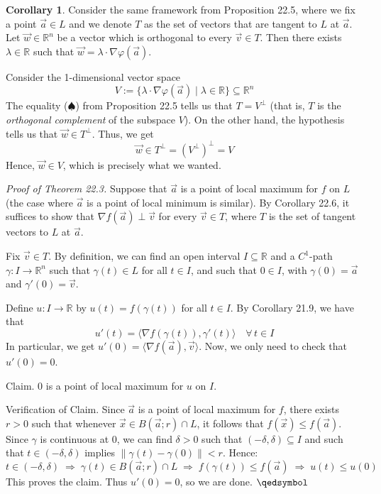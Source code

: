 \documentclass[11pt]{article}
\makeatletter
\theoremstyle{definition}
\newtheorem{cor}[thm]{Corollary}
\newcommand{\R}{\ensuremath{\mathbb{R}}}
\newenvironment{pf}[1][\proofname]{\par
  \pushQED{\qed}%
  \normalfont \topsep0\p@\relax
  \trivlist
  \item[\hskip\labelsep\itshape
  #1\@addpunct{.}]\ignorespaces
}{%
  \popQED\endtrivlist\@endpefalse
}
\makeatother
\begin{document}
\begin{cor}
Consider the same framework from Proposition 22.5, where we fix a point $\vec{a} \in L$ and we denote $T$ as the set of vectors that are tangent to $L$ at $\vec{a}$. Let $\vec{w} \in \R^n$ be a vector which is orthogonal to every $\vec{v} \in T$. Then there exists $\lambda \in \R$ such that $\vec{w} = \lambda \cdot \nabla \varphi(\vec{a})$.
\begin{pf}
Consider the 1-dimensional vector space 
$$V := \{ \lambda \cdot \nabla \varphi(\vec{a}) \mid \lambda \in \R\} \subseteq \R^n$$
The equality ($\spadesuit$) from Proposition 22.5 tells us that $T = V^\perp$ (that is, $T$ is the \emph{orthogonal complement} of the subspace $V$). On the other hand, the hypothesis tells us that $\vec{w} \in T^\perp$. Thus, we get
$$\vec{w} \in T^\perp = (V^\perp)^\perp = V$$
Hence, $\vec{w} \in V$, which is precisely what we wanted.
\end{pf}
\end{cor}

\emph{Proof of Theorem 22.3.} 
Suppose that $\vec{a}$ is a point of local maximum for $f$ on $L$ (the case where $\vec{a}$ is a point of local minimum is similar). By Corollary 22.6, it suffices to show that $\nabla f(\vec{a}) \perp \vec{v}$ for every $\vec{v} \in T$, where $T$ is the set of tangent vectors to $L$ at $\vec{a}$.

Fix $\vec{v} \in T$. By definition, we can find an open interval $I \subseteq \R$ and a $C^1$-path $\gamma : I \to \R^n$ such that $\gamma(t) \in L$ for all $t \in I$, and such that $0 \in I$, with $\gamma(0) = \vec{a}$ and $\gamma'(0) = \vec{v}$. 

Define $u : I \to \R$ by $u(t) = f(\gamma(t))$ for all $t \in I$. By Corollary 21.9, we have that
$$u'(t) = \langle \nabla f(\gamma(t)), \gamma'(t) \rangle \quad \forall\,t \in I$$
In particular, we get $u'(0) = \langle \nabla f(\vec{a}), \vec{v} \rangle$. Now, we only need to check that $u'(0) = 0$. 

{\sc Claim.} 0 is a point of local maximum for $u$ on $I$.

{\sc Verification of Claim.} Since $\vec{a}$ is a point of local maximum for $f$, there exists $r > 0$ such that whenever $\vec{x} \in B(\vec{a}; r) \cap L$, it follows that $f(\vec{x}) \leq f(\vec{a})$. Since $\gamma$ is continuous at 0, we can find $\delta > 0$ such that $(-\delta, \delta) \subseteq I$ and such that $t \in (-\delta, \delta)$ implies $\|\gamma(t) - \gamma(0)\| < r$. Hence:
$$t \in (-\delta, \delta) \; \Rightarrow \; \gamma(t) \in B(\vec{a}; r) \cap L \; \Rightarrow \; f(\gamma(t)) \leq f(\vec{a}) \; \Rightarrow \; u(t) \leq u(0)$$
This proves the claim. Thus $u'(0) = 0$, so we are done. \hfill $\qedsymbol$
\end{document}
